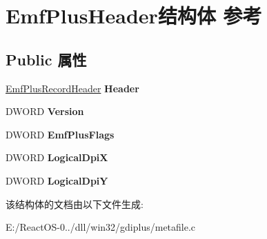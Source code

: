 \hypertarget{struct_emf_plus_header}{}\section{Emf\+Plus\+Header结构体 参考}
\label{struct_emf_plus_header}
\subsection*{Public 属性}
\begin{DoxyCompactItemize}
\item 
\mbox{\label{struct_emf_plus_header_a992cbb2d420c2e68ab311f5530fe25ed}} 
\hyperlink{struct_emf_plus_record_header}{Emf\+Plus\+Record\+Header} {\bfseries Header}
\item 
\mbox{\label{struct_emf_plus_header_a6e1154bec2ea748f969b3755086dbe47}} 
D\+W\+O\+RD {\bfseries Version}
\item 
\mbox{\label{struct_emf_plus_header_afbda78dec6b149170bf4e2e4c948054b}} 
D\+W\+O\+RD {\bfseries Emf\+Plus\+Flags}
\item 
\mbox{\label{struct_emf_plus_header_af777617357635b65aa05d6a442337837}} 
D\+W\+O\+RD {\bfseries Logical\+DpiX}
\item 
\mbox{\label{struct_emf_plus_header_ac06efc02fe760c4ec0044d8fbe608d75}} 
D\+W\+O\+RD {\bfseries Logical\+DpiY}
\end{DoxyCompactItemize}


该结构体的文档由以下文件生成\+:\begin{DoxyCompactItemize}
\item 
E\+:/\+React\+O\+S-\/0../dll/win32/gdiplus/metafile.\+c\end{DoxyCompactItemize}
